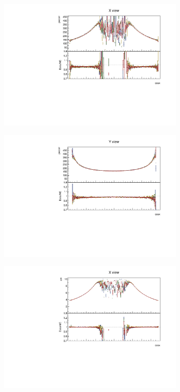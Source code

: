 \documentclass[12pt,a4paper]{article}
\begin{document}
\begin{figure}[!ht]
\begin{subfigure}{0.5\textwidth}
  \end{subfigure}
  \begin{subfigure}{0.5\textwidth}
    \includegraphics[width=\linewidth]{PlotsAngularDistribution/pecorr_cosx_x.pdf}
  \end{subfigure}
  \begin{subfigure}{0.5\textwidth}
    \includegraphics[width=\linewidth]{PlotsAngularDistribution/pecorr_cosx_y.pdf}
  \end{subfigure}
  \begin{subfigure}{0.5\textwidth}
    \includegraphics[width=\linewidth]{PlotsAngularDistribution/cm_cosx_x.pdf}

\end{subfigure}
\end{figure}
\end{document}
